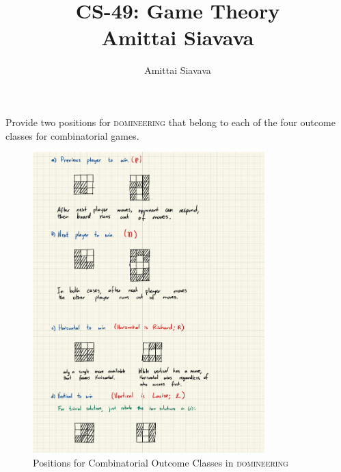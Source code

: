 \documentclass[11pt, reqno]{amsart}
\begin{document}

\title{CS-49: Game Theory\\ Amittai Siavava \\ }
\author{Amittai Siavava}


\setlength{\headheight}{13.0pt}
\setlength{\footskip}{15.0pt}

\maketitle

\def \cram { \textsc{cram} }
\def \dom { \textsc{domineering} }

\newpage
\begin{problem}[5]
  Provide two positions for \dom that belong to each of the four outcome classes
  for combinatorial games.



  \begin{figure}[H]
        
    \includegraphics[width=0.8\textwidth]{game-graph.pdf}

    \caption{Positions for Combinatorial Outcome Classes in \dom}
  \end{figure}
\end{problem}
\end{document}
